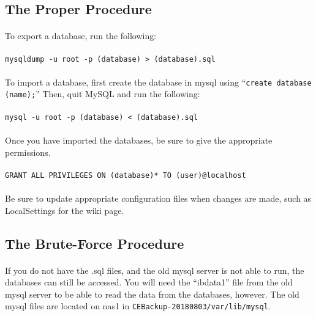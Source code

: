 \documentclass[12pt]{article}
\begin{document}
\subsection{The Proper Procedure}
\paragraph{} To export a database, run the following:
\paragraph{}{\tt mysqldump -u root -p (database) > (database).sql}
\paragraph{} To import a database, first create the database in mysql using ``{\tt create database (name);}'' Then, quit MySQL and run the following:
\paragraph{}{\tt mysql -u root -p (database) < (database).sql}
\paragraph{} Once you have imported the databases, be sure to give the appropriate permissions.
\paragraph{} {\tt GRANT ALL PRIVILEGES ON (database)* TO (user)@localhost}
\paragraph{} Be sure to update appropriate configuration files when changes are made, such as LocalSettings for the wiki page.

\subsection{The Brute-Force Procedure}
\paragraph{} If you do not have the .sql files, and the old mysql server is not able to run, the databases can still be accessed. You will need the ``ibdata1'' file from the old mysql server to be able to read the data from the databases, however. The old mysql files are located on nas1 in {\tt CEBackup-20180803/var/lib/mysql}.
\end{document}
